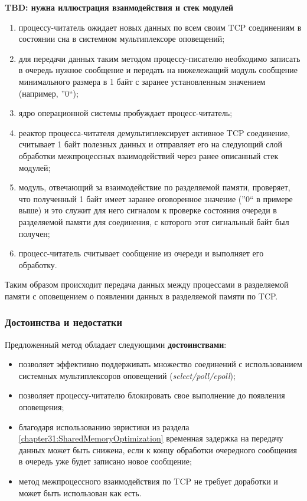 \textbf{TBD: нужна иллюстрация взаимодействия и стек модулей}

\begin{enumerate}
\item процессу-читатель ожидает новых данных по всем своим TCP соединениям в состоянии сна в системном мультиплексоре оповещений;
\item для передачи данных таким методом процессу-писателю необходимо записать в очередь нужное сообщение и передать на нижележащий модуль сообщение минимального размера в 1 байт с заранее установленным значением (например, ''0``);
\item ядро операционной системы пробуждает процесс-читатель;
\item реактор процесса-читателя демультиплексирует активное TCP соединение, считывает 1 байт полезных данных и отправляет его на следующий слой обработки межпроцессных взаимодействий через ранее описанный стек модулей;
\item модуль, отвечающий за взаимодействие по разделяемой памяти, проверяет, что полученный 1 байт имеет заранее оговоренное значение (''0`` в примере выше) и это служит для него сигналом к проверке состояния очереди в разделяемой памяти для соединения, с которого этот сигнальный байт был получен;
\item процесс-читатель считывает сообщение из очереди и выполняет его обработку.
\end{enumerate}

Таким образом происходит передача данных между процессами в разделяемой памяти с оповещением о появлении данных в разделяемой памяти по TCP.

\subsubsection{Достоинства и недостатки}

Предложенный метод обладает следующими \textbf{достоинствами}:
\begin{itemize}
\item позволяет эффективно поддерживать множество соединений с использованием системных мультиплексоров оповещений (\textit{select/poll/epoll});
\item позволяет процессу-читателю блокировать свое выполнение до появления оповещения;
\item благодаря использованию эвристики из раздела \ref{chapter31:SharedMemoryOptimization} временная задержка на передачу данных может быть снижена, если к концу обработки очередного сообщения в очередь уже будет записано новое сообщение;
\item метод межпроцессного взаимодействия по TCP не требует доработки и может быть использован как есть.
\end{itemize}

